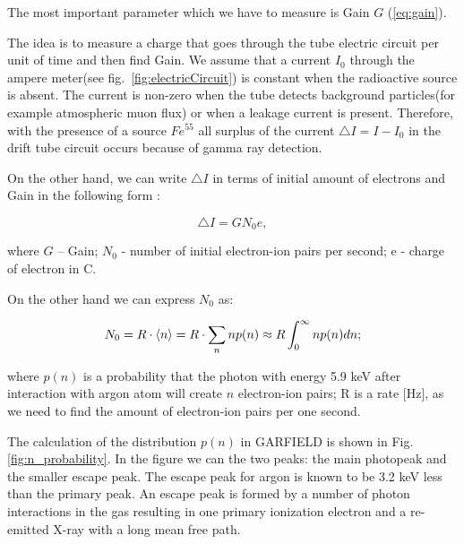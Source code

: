 	The most important parameter which we have to measure is Gain $G$ (\ref{eq:gain}).
	
	The idea is to measure a charge that goes through the tube electric circuit per unit of time and then find Gain.  We assume that a current $I_0$ through the ampere meter(see fig.~\ref{fig:electricCircuit}) is constant when the radioactive source is absent. The current  is non-zero when the tube detects background particles(for example atmospheric muon flux) or when  a leakage current is present. Therefore, with the presence of a source $Fe^{55}$ all surplus of the current $\bigtriangleup I = I-I_0$ in the drift tube circuit occurs because of gamma ray detection.
	
	On the other hand, we can write $\bigtriangleup I$ in terms of initial amount of electrons and Gain in the following form :
	
	\begin{equation}
	\bigtriangleup I = G N_0 e,
	\label{eq:IGainN0}
	\end{equation}
	
	where $G$ -- Gain; $N_0$ - number of initial electron-ion pairs per second; e - charge of electron in C.
	
	On the other hand we can express $N_0$ as:

	\begin{equation}
	N_0 = R \cdot \left< n \right> = R \cdot\sum_n n p(n) \approx R \int_0^\infty n p(n) dn;
	\end{equation}

	where  $p(n)$ is a probability that the photon with energy 5.9 keV after interaction with argon atom will create $n$ electron-ion pairs; R is a rate [Hz], as we need to find the amount of electron-ion pairs per one second.

	The calculation of the distribution 	$p(n)$  in GARFIELD is shown in Fig.\ref{fig:n_probability}. In the figure we can the two peaks: the main photopeak and the smaller escape peak. 
	The escape peak for argon is known to be 3.2 keV less than the primary peak. An escape peak is formed by a number of photon interactions in the gas resulting in one primary ionization electron and a re-emitted X-ray with a long mean free path.
	
